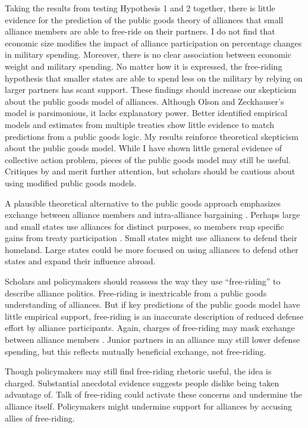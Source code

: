 \documentclass[12pt]{article}
\begin{document}
Taking the results from testing Hypothesis 1 and 2 together, there is little evidence for the prediction of the public goods theory of alliances that small alliance members are able to free-ride on their partners. 
I do not find that economic size modifies the impact of alliance participation on percentage changes in military spending.
Moreover, there is no clear association between economic weight and military spending. 
No matter how it is expressed, the free-riding hypothesis that smaller states are able to spend less on the military by relying on larger partners has scant support. 
These findings should increase our skepticism about the public goods model of alliances. 
Although Olson and Zeckhauser's model is parsimonious, it lacks explanatory power. 
Better identified empirical models and estimates from multiple treaties show little evidence to match predictions from a public goods logic. 
My results reinforce theoretical skepticism about the public goods model. 
While I have shown little general evidence of collective action problem, pieces of the public goods model may still be useful. 
Critiques by \citet{Palmer1990} and \citet{SandlerHartley2001} merit further attention, but scholars should be cautious about using modified public goods models. 


A plausible theoretical alternative to the public goods approach emphasizes exchange between alliance members and intra-alliance bargaining \citep{Norrlof2010, Brooksetal2013, Kim2016}. 
Perhaps large and small states use alliances for distinct purposes, so members reap specific gains from treaty participation \citep{Morrow1991, Johnson2015}. 
Small states might use alliances to defend their homeland. 
Large states could be more focused on using alliances to defend other states and expand their influence abroad. 


Scholars and policymakers should reassess the way they use ``free-riding'' to describe alliance politics. 
Free-riding is inextricable from a public goods understanding of alliances.
But if key predictions of the public goods model have little empirical support, free-riding is an inaccurate description of reduced defense effort by alliance participants.  
Again, charges of free-riding may mask exchange between alliance members \citep{Lanoszka2015}. 
Junior partners in an alliance may still lower defense spending, but this reflects mutually beneficial exchange, not free-riding. 


Though policymakers may still find free-riding rhetoric useful, the idea is charged. 
Substantial anecdotal evidence suggests people dislike being taken advantage of. 
Talk of free-riding could activate these concerns and undermine the alliance itself.
Policymakers might undermine support for alliances by accusing allies of free-riding. 
\end{document}
